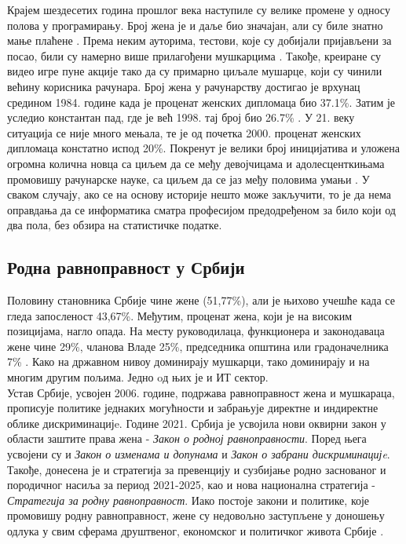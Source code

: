 \documentclass[a4paper]{article}
\begin{document}
\newpage
Крајем шездесетих година прошлог века наступиле су велике промене у односу полова у програмирању. 
Број жена је и даље био значајан, али су биле знатно мање плаћене \cite{women_education_it, 
women_price}. Према неким ауторима, тестови, које су добијали пријављени за посао, били су 
намерно више прилагођени мушкарцима \cite{women_price}. Такође, креиране су видео игре пуне акције
тако да су примарно циљале мушарце, који су чинили већину корисника рачунара. Број жена 
у рачунарству достигао је врхунац средином 1984. године када је проценат женских дипломаца био 
37.1\%. Затим је уследио константан пад, где је већ 1998. тај број био 26.7\% 
\cite{women_procent}. У 21. веку ситуација се није много мењала, те је од почетка 2000. проценат 
женских дипломаца констатно испод 20\%. Покренут је велики број иницијатива и уложена огромна 
колична новца са циљем да се међу девојчицама и адолесценткињама промовишу рачунарске науке, са 
циљем да се јаз међу половима умањи \cite{smanjenje_jaza}. У сваком случају, ако се на основу 
историје нешто може закључити, то је да нема оправдања да се информатика сматра професијом 
предодређеном за било који од два пола, без обзира на статистичке податке.


\subsection{Родна равноправност у Србији}

Половину становника Србије чине жене (51,77\%), али је њихово учешће када се гледа запосленост 
43,67\%. Међутим, проценат жена, који је на високим позицијама, нагло опада. На месту 
руководилаца, функционера и законодаваца жене чине 29\%, чланова Владе 25\%, председника општина 
или градоначелника 7\% \cite{stat}. Како на државном нивоу доминирају мушкарци, тако доминирају и 
на многим другим пољима. Једно oд њих је и ИТ сектор.\\

Устав Србије, усвојен 2006. године, подржава равноправност жена и мушкараца, прописује политике 
једнаких могућности и забрањује директне и индиректне облике дискриминацијe. Године 2021. Србија 
је усвојила нови оквирни закон у области заштите права жена - \textit{Закон о родној 
равноправности}. Поред њега усвојени су и \textit{Закон о изменама и допунама} и \textit{Закон о 
забрани дискриминацијe}. Такође, донесена је и стратегија за превенцију и сузбијање родно 
заснованог и породичног насиља за период 2021-2025, као и нова национална стратегија - 
\textit{Стратегија за родну равноправност}. Иако постоје закони и политике, које промовишу родну 
равноправност, жене су недовољно заступљене у доношењу одлука у свим сферама друштвеног, 
економског и политичког живота Србије \cite{zakon1}. \\ 
\end{document}
